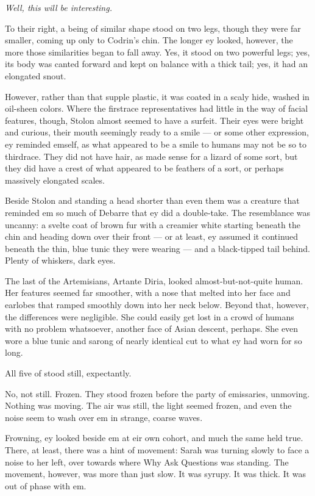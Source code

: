 \emph{Well, this will be interesting.}

To their right, a being of similar shape stood on two legs, though they were far smaller, coming up only to Codrin's chin. The longer ey looked, however, the more those similarities began to fall away. Yes, it stood on two powerful legs; yes, its body was canted forward and kept on balance with a thick tail; yes, it had an elongated snout.

However, rather than that supple plastic, it was coated in a scaly hide, washed in oil-sheen colors. Where the firstrace representatives had little in the way of facial features, though, Stolon almost seemed to have a surfeit. Their eyes were bright and curious, their mouth seemingly ready to a smile — or some other expression, ey reminded emself, as what appeared to be a smile to humans may not be so to thirdrace. They did not have hair, as made sense for a lizard of some sort, but they did have a crest of what appeared to be feathers of a sort, or perhaps massively elongated scales.

Beside Stolon and standing a head shorter than even them was a creature that reminded em so much of Debarre that ey did a double-take. The resemblance was uncanny: a svelte coat of brown fur with a creamier white starting beneath the chin and heading down over their front — or at least, ey assumed it continued beneath the thin, blue tunic they were wearing — and a black-tipped tail behind. Plenty of whiskers, dark eyes.

The last of the Artemisians, Artante Diria, looked almost-but-not-quite human. Her features seemed far smoother, with a nose that melted into her face and earlobes that ramped smoothly down into her neck below. Beyond that, however, the differences were negligible. She could easily get lost in a crowd of humans with no problem whatsoever, another face of Asian descent, perhaps. She even wore a blue tunic and sarong of nearly identical cut to what ey had worn for so long.

All five of stood still, expectantly.

No, not still. Frozen. They stood frozen before the party of emissaries, unmoving. Nothing was moving. The air was still, the light seemed frozen, and even the noise seem to wash over em in strange, coarse waves.

Frowning, ey looked beside em at eir own cohort, and much the same held true. There, at least, there was a hint of movement: Sarah was turning slowly to face a noise to her left, over towards where Why Ask Questions was standing. The movement, however, was more than just slow. It was syrupy. It was thick. It was out of phase with em.

